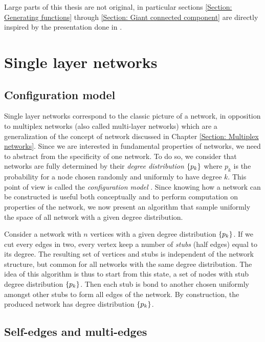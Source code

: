 \documentclass[
11pt, %
english, %
singlespacing, %
liststotoc, %
headsepline, %
]{MastersDoctoralThesis} %
\begin{document}
Large parts of this thesis are not original, in particular sections \ref{Section: Generating functions} through \ref{Section: Giant connected component} are directly inspired by the presentation done in \cite{newman2010networks}.


\chapter{Single layer networks}
\label{Section: Single layer networks}

\section{Configuration model}
\label{Section: Configuration model}

Single layer networks correspond to the classic picture of a network, in opposition to multiplex networks (also called multi-layer networks) which are a generalization of the concept of network discussed in Chapter \ref{Section: Multiplex networks}. Since we are interested in fundamental properties of networks, we need to abstract from the specificity of one network. To do so, we consider that networks are fully determined by their \emph{degree distribution} $\{p_k\}$ where $p_k$ is the probability for a node chosen randomly and uniformly to have degree $k$. This point of view is called the \emph{configuration model} \missingref. Since knowing how a network can be constructed is useful both conceptually and to perform computation on properties of the network, we now present an algorithm that sample uniformly the space of all network with a given degree distribution.

Consider a network with $n$ vertices with a given degree distribution $\{p_k\}$. If we cut every edges in two, every vertex keep a number of \emph{stubs} (half edges) equal to its degree. The resulting set of vertices and stubs is independent of the network structure, but common for all networks with the same degree distribution. The idea of this algorithm is thus to start from this state, a set of nodes with stub degree distribution $\{p_k\}$. Then each stub is bond to another chosen uniformly amongst other stubs to form all edges of the network. By construction, the produced network has degree distribution $\{p_k\}$.


\section{Self-edges and multi-edges}
\end{document}
